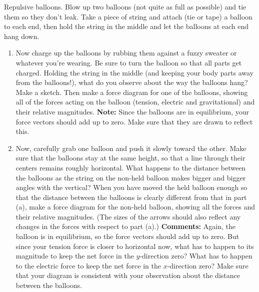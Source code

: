 \begin{aproblem}{Repulsive balloons.}  
  Blow up two balloons (not quite as full as possible) and tie them so
  they don't leak.  Take a piece of string and attach (tie or tape) a
  balloon to each end, then hold the string in the middle and let the
  balloons at each end hang down.
  \begin{enumerate}
  \item Now charge up the balloons by rubbing them against a fuzzy
    sweater or whatever you're wearing.  Be sure to turn the balloon
    so that all parts get charged.  Holding the string in the middle
    (and keeping your body parts away from the balloons!), what do you
    observe about the way the balloons hang?  Make a sketch.  Then
    make a force diagram for one of the balloons, showing all of the
    forces acting on the balloon (tension, electric and gravitational)
    and their relative magnitudes.  \textbf{\textbf{Note:}} Since the
    balloons are in equilibrium, your force vectors should add up to
    zero.  Make sure that they are drawn to reflect this.
  \item Now, carefully grab one balloon and push it slowly toward the
    other.  Make sure that the balloons stay at the same height, so
    that a line through their centers remains roughly horizontal.
    What happens to the distance between the balloons as the string on
    the non-held balloon makes bigger and bigger angles with the
    vertical?  When you have moved the held balloon enough so that the
    distance between the balloons is clearly different from that in
    part (a), make a force diagram for the non-held balloon, showing
    all the forces and their relative magnitudes.  (The sizes of the
    arrows should also reflect any changes in the forces with respect
    to part (a).)  \textbf{Comments: } Again, the balloon is in
    equilibrium, so the force vectors should add up to zero.  But
    since your tension force is closer to horizontal now, what has to
    happen to its magnitude to keep the net force in the $y$-direction
    zero?  What has to happen to the electric force to keep the net
    force in the $x$-direction zero?  Make sure that your diagram is
    consistent with your observation about the distance between the
    balloons.
  \end{enumerate}
\end{aproblem}


